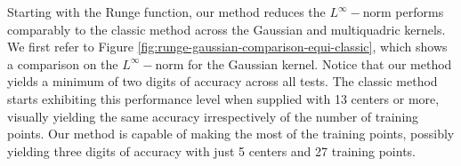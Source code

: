 \documentclass[12pt]{report} %
\begin{document}
Starting with the Runge function, our method reduces the
$L^{\infty} -$norm performs comparably to the classic method across the Gaussian and multiquadric kernels.
We first refer to Figure \ref{fig:runge-gaussian-comparison-equi-classic}, which shows a comparison on the $L^\infty-$norm for the Gaussian kernel. Notice that our method yields a minimum of two digits of accuracy across all tests. The classic method starts exhibiting this performance level when supplied with 13
centers or more, visually yielding the same accuracy irrespectively of the number of training points. Our method is capable of making the most of the training points, possibly yielding three digits of accuracy with just 5 centers and 27 training points. %
\end{document}
